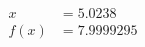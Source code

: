 \documentclass[preview]{standalone}
\begin{document}
\begin{align*}
x &= 5.0238\\f(x) &= 7.9999295
\end{align*}
\end{document}
